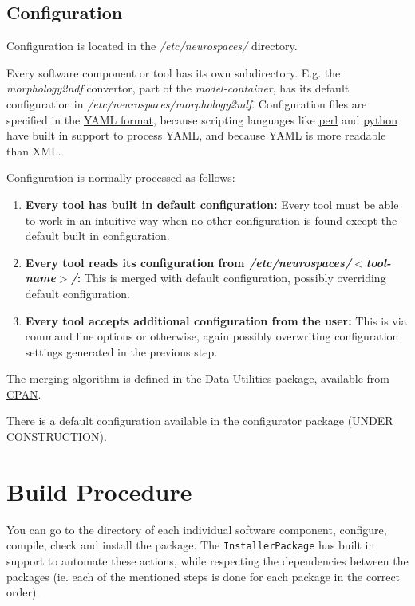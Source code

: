 \documentclass[12pt]{article}
\begin{document}
\subsection*{Configuration}

Configuration is located in the {\it /etc/neurospaces/} directory.

Every software component or tool has its own subdirectory. E.g. the {\it morphology2ndf} convertor, part of the {\it model-container}, has its default configuration in {\it /etc/neurospaces/morphology2ndf}. Configuration files are specified in the \href{http://www.yaml.org/}{YAML format}, because scripting languages like \href{http://www.perl.org/}{perl} and \href{http://www.python.org/}{python} have built in support to process YAML, and because YAML is more readable than XML.

Configuration is normally processed as follows:
\begin{enumerate}
\item {\bf Every tool has built in default configuration:} Every tool must be able to work in an intuitive way when no other configuration is found except the default built in configuration.
\item {\bf Every tool reads its configuration from {\it /etc/neurospaces/$<$tool-name$>$/}:} This is merged with default configuration, possibly overriding default configuration.
\item {\bf Every tool accepts additional configuration from the user:} This is via command line options or otherwise, again possibly overwriting configuration settings generated in the previous step. 
\end{enumerate}
The merging algorithm is defined in the \href{http://search.cpan.org/dist/Data-Utilities/}{Data-Utilities package}, available from \href{http://www.cpan.org/}{CPAN}.

There is a default configuration available in the configurator package (UNDER CONSTRUCTION). 

\section*{Build Procedure}

You can go to the directory of each individual software component, configure, compile, check and install the package. The {\tt InstallerPackage} has built in support to automate these actions, while respecting the dependencies between the packages (ie. each of the mentioned steps is done for each package in the correct order).
\end{document}
